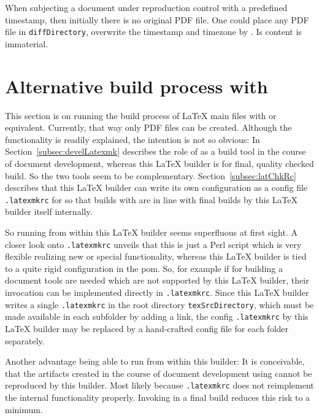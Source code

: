 When subjecting a document under reproduction control with a predefined timestamp, 
then initially there is no original PDF file. 
One could place any PDF file in \texttt{diffDirectory}, 
overwrite the timestamp and timezone by . 
Is content is immaterial. 




\section{Alternative build process with \protect{}}\label{sec:latexmk}%

This section is on running the build process of \LaTeX{} main files 
with  or equivalent. 
Currently, that way only PDF files can be created. 
Although the functionality is readily explained, 
the intention is not so obvious: 
In Section~\ref{subsec:develLatexmk} 
describes the role of  as a build tool 
in the course of document development, 
whereas this \LaTeX{} builder is for final, quality checked build. 
So the two tools seem to be complementary. 
Section~\ref{subsec:latChkRc} describes that this \LaTeX{} builder 
can write its own configuration as 
a config file \texttt{.latexmkrc} for  
so that builds with  are in line 
with final builds by this \LaTeX{} builder itself internally. 

So running  from within this \LaTeX{} builder 
seems superfluous at first sight. 
A closer look onto \texttt{.latexmkrc} unveils that this is just a Perl script 
which is very flexible realizing new or special functionality, 
whereas this \LaTeX{} builder is tied to a quite rigid configuration in the pom. 
So, for example if for building a document tools are needed 
which are not supported by this \LaTeX{} builder, 
their invocation can be implemented directly in \texttt{.latexmkrc}. 
Since this \LaTeX{} builder writes a single \texttt{.latexmkrc} 
in the root directory \texttt{texSrcDirectory}, 
which must be made available in each subfolder by adding a link, 
the config \texttt{.latexmkrc} by this \LaTeX{} builder 
may be replaced by a hand-crafted config file for each folder separately. 

Another advantage being able to run  from within this builder: 
It is conceivable, that the artifacts created in the course of document development 
using  cannot be reproduced by this builder. 
Most likely because \texttt{.latexmkrc} does not reimplement the internal functionality properly. 
Invoking  in a final build reduces this risk to a minimum. 

